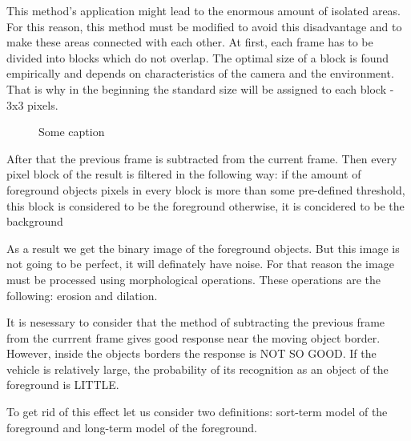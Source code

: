 \documentclass[12pt,a4paper,oneside,titlepage]{article}
\begin{document}
This method's application might lead to the  enormous amount of isolated areas.
For this reason, this method must be modified to avoid this disadvantage and to make these areas connected with each other.
At first, each frame has to be divided into blocks which do not overlap.
The optimal size of a block is found empirically and depends on characteristics of the camera and the environment.
That is why in the beginning the standard size will be assigned to each block - 3x3 pixels.

\begin{figure}[h]
  \caption{Some caption}
  \label{fig:fig2}
\end{figure}



After that the previous frame is subtracted from the current frame.
Then every pixel block of the result is filtered in the following way:
if the amount of foreground objects pixels in every block is more than some pre-defined threshold, this block is considered to be the foreground
otherwise, it is concidered to be the background

As a result we get the binary image of the foreground objects.
But this image is not going to be perfect, it will definately have noise.
For that reason the image must be processed using morphological operations.
These operations are the following: erosion and dilation.

It is nesessary to consider that the method of subtracting the previous frame from the currrent frame gives good response near the moving object border. 
However, inside the objects borders the response is NOT SO GOOD.
If the vehicle is relatively large, the probability of its recognition as an object of the foreground is LITTLE.

To get rid of this effect let us consider two definitions: sort-term model of the foreground and long-term model of the foreground.


\end{document}
